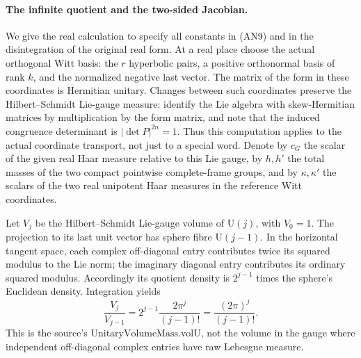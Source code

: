 \paragraph{The infinite quotient and the two-sided Jacobian.}
We give the real calculation to specify all constants in
(AN9) and in the disintegration of the original real form.
At a real place choose the actual orthogonal Witt basis:
the \(r\) hyperbolic pairs, a positive orthonormal basis of
rank \(k\), and the normalized negative last vector.
The matrix of the form in these coordinates is Hermitian
unitary. Changes between such coordinates preserve the
Hilbert--Schmidt Lie-gauge measure: identify the Lie algebra
with skew-Hermitian matrices by multiplication by the form
matrix, and note that the induced congruence determinant
is \(|\det P|^{2n}=1\). Thus this computation applies to
the actual coordinate transport, not just to a special word.
Denote by \(c_G\) the scalar of the given real Haar measure
relative to this Lie gauge, by \(h,h'\) the total masses of
the two compact pointwise complete-frame groups, and by
\(\kappa,\kappa'\) the scalars of the two real unipotent
Haar measures in the reference Witt coordinates.

Let \(V_j\) be the Hilbert--Schmidt Lie-gauge volume of
\(\mathrm U(j)\), with \(V_0=1\). The projection to its last
unit vector has sphere fibre \(\mathrm U(j-1)\). In the
horizontal tangent space, each complex off-diagonal entry
contributes twice its squared modulus to the Lie norm;
the imaginary diagonal entry contributes its ordinary squared
modulus. Accordingly its quotient density is \(2^{j-1}\)
times the sphere's Euclidean density. Integration yields
\[
          \frac{V_j}{V_{j-1}}
             =2^{j-1}\frac{2\pi^j}{(j-1)!}
             =\frac{(2\pi)^j}{(j-1)!}.                 \tag{AN10}
\]
This is the source's \(\mathrm{UnitaryVolumeMass.volU}\), not
the volume in the gauge where independent off-diagonal complex
entries have raw Lebesgue measure.

